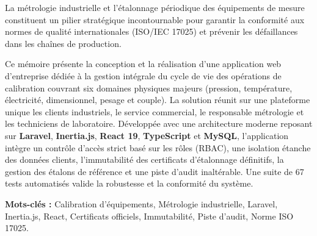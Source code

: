 \documentclass{bts-report}
\begin{document}
\begin{abstractfr}
La m\'etrologie industrielle et l'\'etalonnage p\'eriodique des \'equipements de mesure constituent un pilier strat\'egique incontournable pour garantir la conformit\'e aux normes de qualit\'e internationales (ISO/IEC 17025) et pr\'evenir les d\'efaillances dans les cha\^ines de production. 

Ce m\'emoire pr\'esente la conception et la r\'ealisation d'une application web d'entreprise d\'edi\'ee \`a la gestion int\'egrale du cycle de vie des op\'erations de calibration couvrant six domaines physiques majeurs (pression, temp\'erature, \'electricit\'e, dimensionnel, pesage et couple). La solution r\'eunit sur une plateforme unique les clients industriels, le service commercial, le responsable m\'etrologie et les techniciens de laboratoire. D\'evelopp\'ee avec une architecture moderne reposant sur \textbf{Laravel}, \textbf{Inertia.js}, \textbf{React 19}, \textbf{TypeScript} et \textbf{MySQL}, l'application int\`egre un contr\^ole d'acc\`es strict bas\'e sur les r\^oles (RBAC), une isolation \'etanche des donn\'ees clients, l'immutabilit\'e des certificats d'\'etalonnage d\'efinitifs, la gestion des \'etalons de r\'ef\'erence et une piste d'audit inalt\'erable. Une suite de 67 tests automatis\'es valide la robustesse et la conformit\'e du syst\`eme.

\vspace{0.6cm}
\noindent\textbf{Mots-cl\'es :} Calibration d'\'equipements, M\'etrologie industrielle, Laravel, Inertia.js, React, Certificats officiels, Immutabilit\'e, Piste d'audit, Norme ISO 17025.
\end{abstractfr}
\end{document}
